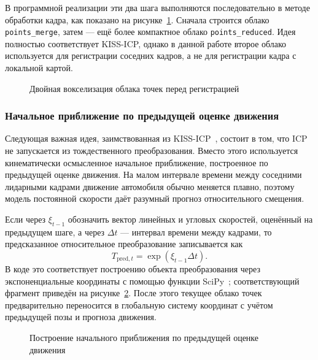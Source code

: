 В программной реализации эти два шага выполняются последовательно в методе обработки кадра, как показано на рисунке~\ref{lst:icp-double-voxelization}. Сначала строится облако \texttt{points\_merge}, затем --- ещё более компактное облако \texttt{points\_reduced}. Идея полностью соответствует KISS-ICP, однако в данной работе второе облако используется для регистрации соседних кадров, а не для регистрации кадра с локальной картой.

\begin{figure}
  \fontsize{12pt}{14pt}\selectfont
  
  \caption{Двойная вокселизация облака точек перед регистрацией}
  \label{lst:icp-double-voxelization}
\end{figure}

\subsubsection{Начальное приближение по предыдущей оценке движения}

Следующая важная идея, заимствованная из KISS-ICP~\cite{kiss-icp}, состоит в том, что ICP не запускается из тождественного преобразования. Вместо этого используется кинематически осмысленное начальное приближение, построенное по предыдущей оценке движения. На малом интервале времени между соседними лидарными кадрами движение автомобиля обычно меняется плавно, поэтому модель постоянной скорости даёт разумный прогноз относительного смещения.

Если через \(\xi_{t-1}\) обозначить вектор линейных и угловых скоростей, оценённый на предыдущем шаге, а через \(\Delta t\) --- интервал времени между кадрами, то предсказанное относительное преобразование записывается как
\begin{equation}
    T_{\mathrm{pred}, t} = \exp(\xi_{t-1} \Delta t).
\end{equation}
В коде это соответствует построению объекта преобразования через экспоненциальные координаты с помощью функции SciPy~\cite{scipy-rigidtransform-from-exp-coords}; соответствующий фрагмент приведён на рисунке~\ref{lst:icp-initial-guess}. После этого текущее облако точек предварительно переносится в глобальную систему координат с учётом предыдущей позы и прогноза движения.

\begin{figure}
  \fontsize{12pt}{14pt}\selectfont
  
  \caption{Построение начального приближения по предыдущей оценке движения}
  \label{lst:icp-initial-guess}
\end{figure}

